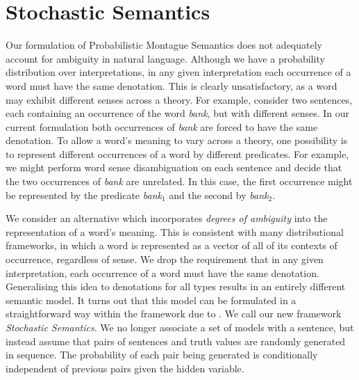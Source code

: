 \documentclass[a4paper,11pt]{article}
\newcommand{\newcite}[1]{\citet{#1}}
\theoremstyle{definition}
\begin{document}
\section{Stochastic Semantics}

Our formulation of Probabilistic Montague Semantics
does not adequately account for ambiguity in natural language.
Although we have a probability distribution over
interpretations, 
in any given interpretation each occurrence of a
word must have the same denotation. This is clearly unsatisfactory, as a
word may exhibit different senses across a
theory. For example, consider two sentences, each
containing  an occurrence of the word \emph{bank}, but with different senses. In our current
formulation both occurrences of \emph{bank} are forced to have the same denotation. To allow
a word's meaning 
to vary across a theory, one possibility
is to represent
different occurrences of a word by different
predicates. For example, we might perform word sense disambiguation on
each sentence and decide that the two occurrences of \emph{bank} are
unrelated. In this case, the first occurrence might be
represented by the predicate {\em bank}$_1$ and the second by {\em
  bank}$_2$.




We consider an alternative which incorporates \emph{degrees of ambiguity} into the representation of a word's meaning. This is consistent with many distributional  frameworks, in which a word is represented as a vector of all of its contexts of occurrence, regardless of sense. 
We drop the requirement that in any given interpretation, each occurrence of a word must have the same denotation. Generalising this idea to denotations for all types results in an entirely different semantic model. It turns out that this model can be formulated in a straightforward way within the framework due to \newcite{Sato:97}. We call our new framework \emph{Stochastic Semantics}.  We no longer
associate a set of models with a sentence, but instead assume that pairs of sentences and
truth values are randomly generated in sequence. The probability of
each pair being generated is conditionally independent of previous
pairs given the hidden variable.
\end{document}
